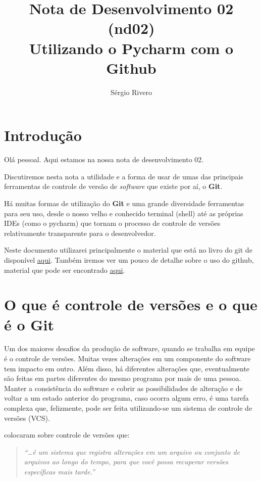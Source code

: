 \documentclass[12pt,a4paper]{article}
\author{Sérgio Rivero}
\title{Nota de Desenvolvimento 02 (nd02) \\ 
		Utilizando o Pycharm com o Github}
\begin{document}
\maketitle

\tableofcontents

\pagebreak

\section{Introdução}

Olá pessoal. Aqui estamos na nossa nota de desenvolvimento 02. 

Discutiremos nesta nota a utilidade e a forma de usar de umas das principais ferramentas de controle de versão de \textit{software} que existe por aí, o \textbf{Git}. 

Há muitas formas de utilização do \textbf{Git} e uma grande diversidade ferramentas para seu uso, desde o nosso velho e conhecido terminal  (shell) até as próprias IDEs (como o pycharm) que tornam o processo de controle de versões relativamente transparente para o desenvolvedor.

Neste documento utilizarei principalmente o material que está no livro do git de  \citet*{Chacon2014} disponível \href{https://git-scm.com/book/en/v2}{aqui}. Também iremos ver um pouco de detalhe sobre o uso do github, material que pode ser encontrado \href{https://lab.github.com/githubtraining/introduction-to-github}{aqui}.

\section{O que é controle de versões e o que é o Git}

Um dos maiores desafios da produção de software, quando se trabalha em equipe é o controle de versões. Muitas vezes alterações em um componente do software tem impacto em outro. Além disso, há diferentes alterações que, eventualmente são feitas em partes diferentes do mesmo programa por mais de uma pessoa. Manter a consistência do software e cobrir as possibilidades de alteração e de voltar a um estado anterior do programa, caso ocorra algum erro, é uma tarefa complexa que, felizmente, pode ser feita utilizando-se um sistema de controle de versões (VCS).

\citet[p. 9]{Chacon2014} colocaram sobre controle de versões que: 
\begin{quotation}
	\textit{
	``\dots é um sistema que registra alterações em um arquivo ou conjunto de arquivos ao longo do tempo, para que você possa recuperar versões específicas mais tarde.''}
\end{quotation}
\end{document}
